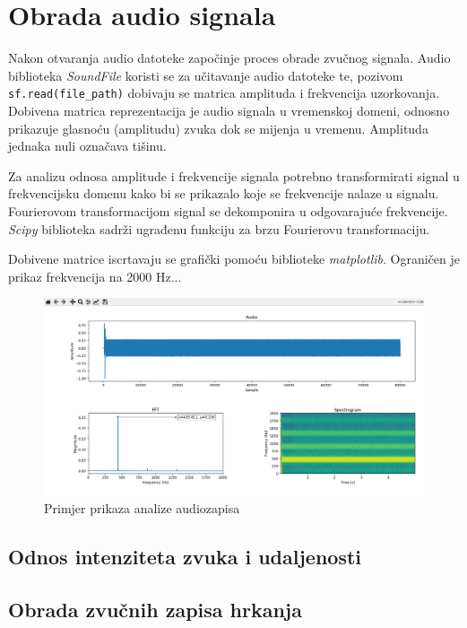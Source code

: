 \chapter{Obrada audio signala}

Nakon otvaranja audio datoteke započinje proces obrade zvučnog signala. Audio biblioteka \textit{SoundFile} koristi se za učitavanje audio datoteke te, pozivom \lstinline|sf.read(file_path)| dobivaju se matrica amplituda i frekvencija uzorkovanja. Dobivena matrica reprezentacija je audio signala u vremenskoj domeni, odnosno prikazuje glasnoću (amplitudu) zvuka dok se mijenja u vremenu. Amplituda jednaka nuli označava tišinu.

Za analizu odnosa amplitude i frekvencije signala potrebno transformirati signal u frekvencijsku domenu kako bi se prikazalo koje se frekvencije nalaze u signalu. Fourierovom transformacijom signal se dekomponira u odgovarajuće frekvencije. \textit{Scipy} biblioteka sadrži ugrađenu funkciju za brzu Fourierovu transformaciju.

Dobivene matrice iscrtavaju se grafički pomoću biblioteke \textit{matplotlib}. Ograničen je prikaz frekvencija na 2000 Hz...


\begin{figure}[ht]
	\includegraphics[width=\linewidth]{imgs/analyse_example}
	\caption{Primjer prikaza analize audiozapisa}
	\label{fig:analyse_example}
\end{figure}

\section{Odnos intenziteta zvuka i udaljenosti}

\section{Obrada zvučnih zapisa hrkanja}
